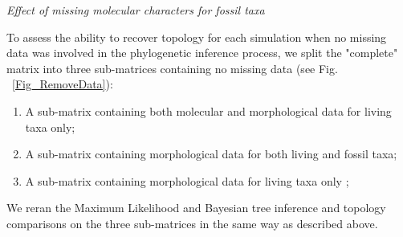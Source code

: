 \documentclass[12pt,letterpaper]{article}
\renewcommand{\subsection}[1]{%
\bigskip
\begin{center}
\begin{large}
\normalfont\itshape #1
\end{large}
\end{center}}
\begin{document}

\subsection{Effect of missing molecular characters for fossil taxa} %
To assess the ability to recover topology for each simulation when no missing data was involved in the phylogenetic inference process, we split the "complete" matrix into three sub-matrices containing no missing data (see Fig. ~\ref{Fig_RemoveData}):
\begin{enumerate}
\item
A sub-matrix containing both molecular and morphological data for living taxa only;
\item
A sub-matrix containing morphological data for both living and fossil taxa;
\item
A sub-matrix containing morphological data for living taxa only ;
\end{enumerate}
We reran the Maximum Likelihood
and Bayesian tree inference and topology comparisons on the three sub-matrices in the same way as described above.
\end{document}
